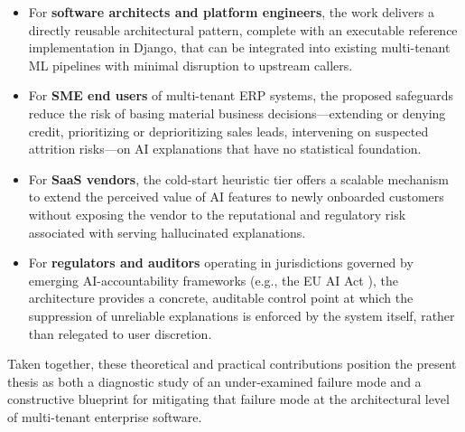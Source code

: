 \begin{itemize}
  \item For \textbf{software architects and platform engineers}, the work delivers a directly reusable architectural pattern, complete with an executable reference implementation in Django, that can be integrated into existing multi-tenant ML pipelines with minimal disruption to upstream callers.

  \item For \textbf{SME end users} of multi-tenant ERP systems, the proposed safeguards reduce the risk of basing material business decisions---extending or denying credit, prioritizing or deprioritizing sales leads, intervening on suspected attrition risks---on AI explanations that have no statistical foundation.

  \item For \textbf{SaaS vendors}, the cold-start heuristic tier offers a scalable mechanism to extend the perceived value of AI features to newly onboarded customers without exposing the vendor to the reputational and regulatory risk associated with serving hallucinated explanations.

  \item For \textbf{regulators and auditors} operating in jurisdictions governed by emerging AI-accountability frameworks (e.g., the EU AI Act \citep{eu2024aiact}), the architecture provides a concrete, auditable control point at which the suppression of unreliable explanations is enforced by the system itself, rather than relegated to user discretion.
\end{itemize}

\noindent
Taken together, these theoretical and practical contributions position the present thesis as both a diagnostic study of an under-examined failure mode and a constructive blueprint for mitigating that failure mode at the architectural level of multi-tenant enterprise software.
